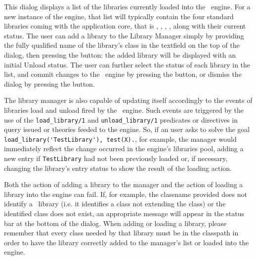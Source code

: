 This dialog displays a list of the libraries currently loaded into the \tuprolog\ engine. For a new instance of the
engine, that list will typically contain the four standard libraries coming with the application core, that is
, , , , along with their
current status. The user can add a library to the Library Manager simply by providing the fully qualified name of the
library's class in the textfield on the top of the dialog, then pressing the  button: the added library
will be displayed with an initial Unload status. The user can further select the status of each library in the list,
and commit changes to the \tuprolog\ engine by pressing the  button, or dismiss the dialog by pressing
the  button.

The library manager is also capable of updating itself accordingly to the events of libraries load and unload fired by
the \tuprolog\ engine.  Such events are triggered by the use of the \verb|load_library/1| and \verb|unload_library/1|
predicates or directives in query issued or theories feeded to the engine. So, if an user asks to solve the goal \verb|load_library('TestLibrary'), test(X).|,
for example, the manager would immediately reflect the change occurred in the engine's libraries pool, adding a new
entry if \verb|TestLibrary| had not been previously loaded or, if necessary, changing the library's entry status to
show the result of the loading action.

Both the action of adding a library to the manager and the action of loading a library into the engine can fail. If,
for example, the classname provided does not identify a \tuprolog\ library (i.e. it identifies a class not extending the
 class) or the identified class does not exist, an appropriate message will appear
in the status bar at the bottom of the dialog. When adding or loading a library, please remember that every class
needed by that library must be in the classpath in order to have the library correctly added to the manager's list or
loaded into the engine.